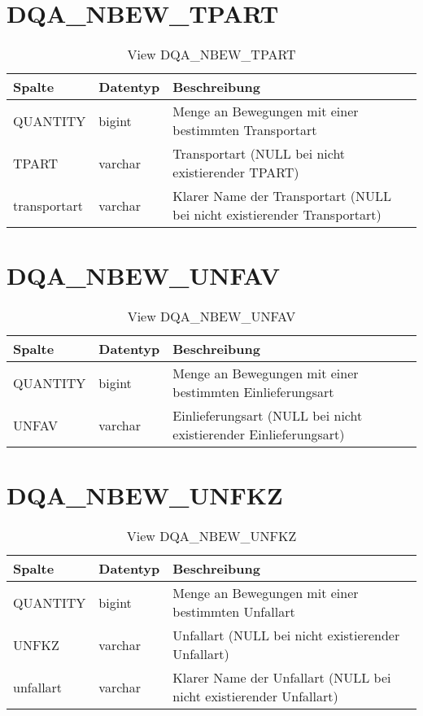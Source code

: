   \section{DQA\_NBEW\_TPART}

  \begin{table}[ht]
    \centering
    \caption{View DQA\_NBEW\_TPART}
    \label{tab:dqanbewtpart}
    \begin{tabular}{||l|l|p{10cm}||}
      \hline
      Spalte & Datentyp & Beschreibung \\ [0.5ex] \hline \hline
QUANTITY & bigint & Menge an Bewegungen mit einer bestimmten Transportart \\ \hline
TPART & varchar & Transportart (NULL bei nicht existierender TPART)\\ \hline
transportart & varchar & Klarer Name der Transportart (NULL bei nicht existierender Transportart)\\ \hline
    \end{tabular}
  \end{table}

  \section{DQA\_NBEW\_UNFAV}

  \begin{table}[ht]
    \centering
    \caption{View DQA\_NBEW\_UNFAV}
    \label{tab:dqanbewunfav}
    \begin{tabular}{||l|l|p{10cm}||}
      \hline
      Spalte & Datentyp & Beschreibung \\ [0.5ex] \hline \hline
QUANTITY & bigint & Menge an Bewegungen mit einer bestimmten Einlieferungsart \\ \hline
UNFAV & varchar & Einlieferungsart (NULL bei nicht existierender Einlieferungsart)\\ \hline
    \end{tabular}
  \end{table}



  \section{DQA\_NBEW\_UNFKZ}

  \begin{table}[ht]
    \centering
    \caption{View DQA\_NBEW\_UNFKZ}
    \label{tab:dqanbewunfkz}
    \begin{tabular}{||l|l|p{10cm}||}
      \hline
      Spalte & Datentyp & Beschreibung \\ [0.5ex] \hline \hline
QUANTITY & bigint & Menge an Bewegungen mit einer bestimmten Unfallart \\ \hline
UNFKZ & varchar & Unfallart (NULL bei nicht existierender Unfallart)\\ \hline
unfallart & varchar & Klarer Name der Unfallart (NULL bei nicht existierender Unfallart)\\ \hline
    \end{tabular}
  \end{table}